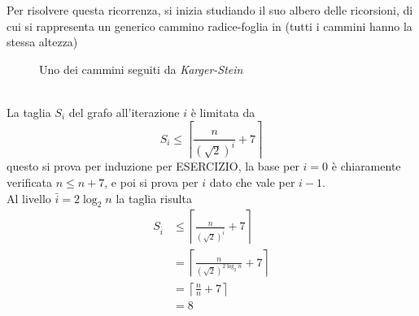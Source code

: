 Per risolvere questa ricorrenza, si inizia studiando il suo albero delle ricorsioni, di cui si rappresenta un generico cammino radice-foglia in  (tutti i cammini hanno la stessa altezza)
\begin{figure}[h]
    \centering
    \caption{Uno dei cammini seguiti da \emph{Karger-Stein}}
    \label{fig:albero_prob_stein}
\end{figure}
\\
La taglia $
S_i
$ del grafo all'iterazione $i$ è limitata da 
\begin{equation*}
    S_i
    \leq
    \left\lceil 
        \frac{
            n
        }{
            \left( 
                \sqrt{2}
            \right)^i
        }
        + 7
    \right\rceil
\end{equation*}
questo si prova per induzione per ESERCIZIO, la base per $i=0$ è chiaramente verificata $n \leq n + 7$, e poi si prova per $i$ dato che vale per $i-1$.
\\
Al livello $
\bar{i}
=
2 \log_2 n
$ la taglia risulta
\begin{align*}
    S_{\bar{i}}
    &
    \leq
    \left\lceil 
        \frac{
            n
        }{
            \left( 
                \sqrt{2}
            \right)^{\bar{i}}
        }
        + 7
    \right\rceil
    \\
    &=
    \left\lceil 
        \frac{
            n
        }{
            \left( 
                \sqrt{2}
            \right)^{
                2 \log_2 n
            }
        }
        + 7
    \right\rceil
    \\
    &=
    \left\lceil 
        \frac{
            n
        }{
            n
        }
        + 7
    \right\rceil
    \\
    &= 
    8
\end{align*}
